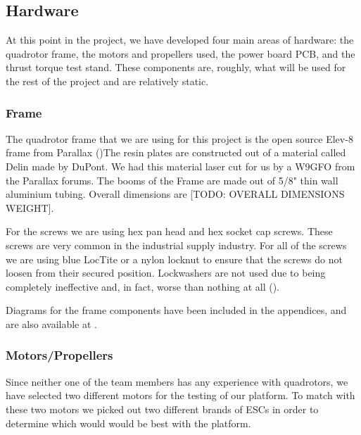 \documentclass{article}
\numberwithin{equation}{section} %
\begin{document}
\subsection{Hardware}
At this point in the project, we have developed four main areas of hardware: the quadrotor frame, the motors and propellers used, the power board PCB, and the thrust torque test stand. These components are, roughly, what will be used for the rest of the project and are relatively static. 

\subsubsection{Frame}
The quadrotor frame that we are using for this project is the open source Elev-8 frame from Parallax (\cite{elev8_frame})The resin plates are constructed out of a material called Delin\textregistered\cite{dupontdelin} made by DuPont\texttrademark. We had this material laser cut for us by a W9GFO from the Parallax forums. The booms of the Frame are made out of 5/8" thin wall aluminium tubing. Overall dimensions are [TODO: OVERALL DIMENSIONS WEIGHT].

For the screws we are using hex pan head and hex socket cap screws. These screws are very common in the industrial supply industry. For all of the screws we are using blue LocTite or a nylon locknut to ensure that the screws do not loosen from their secured position. Lockwashers are not used due to being completely ineffective and, in fact, worse than nothing at all (\cite{vibration_loose}).

Diagrams for the frame components have been included in the appendices, and are also available at \cite{anzhelka_code}.

\subsubsection{Motors/Propellers}

Since neither one of the team members has any experience with quadrotors, we have selected two different motors for the testing of our platform. To match with these two motors we picked out two different brands of ESCs in order to determine which would would be best with the platform.
\end{document}
